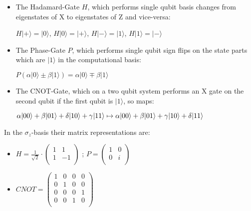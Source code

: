 \begin{itemize}
    \item The Hadamard-Gate $H$, which performs single qubit
    basis changes from eigenstates of X to eigenstates of Z 
    and vice-versa:

    $H|+\rangle = |0\rangle$, $H|0\rangle = |+\rangle$,
    $H|-\rangle = |1\rangle$, $H|1\rangle = |-\rangle$
    
    \item The Phase-Gate $P$, which performs single qubit sign
    flips on the state parts which are $|1\rangle$ in the 
    computational basis:

    $
    P (\alpha|0\rangle \pm \beta |1\rangle) =
    \alpha|0\rangle \mp \beta |1\rangle
    $

    \item The CNOT-Gate, which on a two qubit system performs 
    an X gate on the second qubit if the first qubit is 
    $|1\rangle$, so maps:

    $
    \alpha |00\rangle + \beta |01\rangle + 
    \delta |10\rangle + \gamma |11\rangle \\
    \mapsto
    \alpha |00\rangle + \beta |01\rangle +
    \gamma |10\rangle + \delta |11\rangle
    $
\end{itemize}
In the $\sigma_z$-basis their matrix representations are:
\begin{itemize}
    \item
    \begin{math}
    H = 
    \frac{1}{\sqrt{2}}\cdot\left( 
    \begin{array}{cc}
       1 & 1 \\
       1 & -1 \\
    \end{array}
    \right)\end{math} 
;
    \begin{math}
    P = 
    \left(\begin{array}{cc}
        1 & 0 \\
        0 & i \\
    \end{array}\right)
    \end{math}
    
    \item 
    \begin{math}
    CNOT = 
    \left(\begin{array}{cccc}
        1 & 0 & 0 & 0 \\
        0 & 1 & 0 & 0 \\
        0 & 0 & 0 & 1 \\
        0 & 0 & 1 & 0 \\
    \end{array}\right)
   \end{math} 
\end{itemize}
